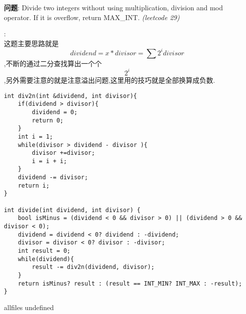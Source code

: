 \documentclass{article}
\begin{document}
\begin{CJK}{UTF8}{gbsn}     %

\else
    
\begin{description}
    \item{\textbf{问题}}: Divide two integers without using multiplication, division and mod operator. If it is overflow, return MAX\_INT.  \textit{(leetcode 29)}
    \item{\textbf{}} : 
    \\这题主要思路就是$$dividend = x*divisor = \sum2^idivisor$$,不断的通过二分查找算出一个个$$2^i$$,另外需要注意的就是注意溢出问题,这里用的技巧就是全部换算成负数.
    \begin{lstlisting}
int div2n(int &dividend, int divisor){
	if(dividend > divisor){
		dividend = 0;
		return 0;
	}
	int i = 1;
	while(divisor > dividend - divisor ){
		divisor +=divisor;
		i = i + i;
	}
	dividend -= divisor;
	return i;
}

int divide(int dividend, int divisor) {
	bool isMinus = (dividend < 0 && divisor > 0) || (dividend > 0 && divisor < 0);
	dividend = dividend < 0? dividend : -dividend;
	divisor = divisor < 0? divisor : -divisor;
	int result = 0;
	while(dividend){
		result -= div2n(dividend, divisor);
	}
	return isMinus? result : (result == INT_MIN? INT_MAX : -result);
}
    \end{lstlisting}
    \textit{}
\end{description}

\fi

\ifx allfiles undefined
\end{CJK}
\end{document}
